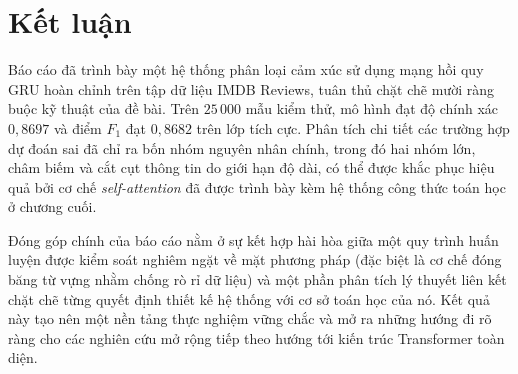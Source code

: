 \section{Kết luận}

Báo cáo đã trình bày một hệ thống phân loại cảm xúc sử dụng mạng hồi quy GRU hoàn chỉnh trên tập dữ liệu IMDB Reviews, tuân thủ chặt chẽ mười ràng buộc kỹ thuật của đề bài. Trên $25\,000$ mẫu kiểm thử, mô hình đạt độ chính xác $0,8697$ và điểm $F_1$ đạt $0,8682$ trên lớp tích cực. Phân tích chi tiết các trường hợp dự đoán sai đã chỉ ra bốn nhóm nguyên nhân chính, trong đó hai nhóm lớn, châm biếm và cắt cụt thông tin do giới hạn độ dài, có thể được khắc phục hiệu quả bởi cơ chế \textit{self-attention} đã được trình bày kèm hệ thống công thức toán học ở chương cuối. 

Đóng góp chính của báo cáo nằm ở sự kết hợp hài hòa giữa một quy trình huấn luyện được kiểm soát nghiêm ngặt về mặt phương pháp (đặc biệt là cơ chế đóng băng từ vựng nhằm chống rò rỉ dữ liệu) và một phần phân tích lý thuyết liên kết chặt chẽ từng quyết định thiết kế hệ thống với cơ sở toán học của nó. Kết quả này tạo nên một nền tảng thực nghiệm vững chắc và mở ra những hướng đi rõ ràng cho các nghiên cứu mở rộng tiếp theo hướng tới kiến trúc Transformer toàn diện.